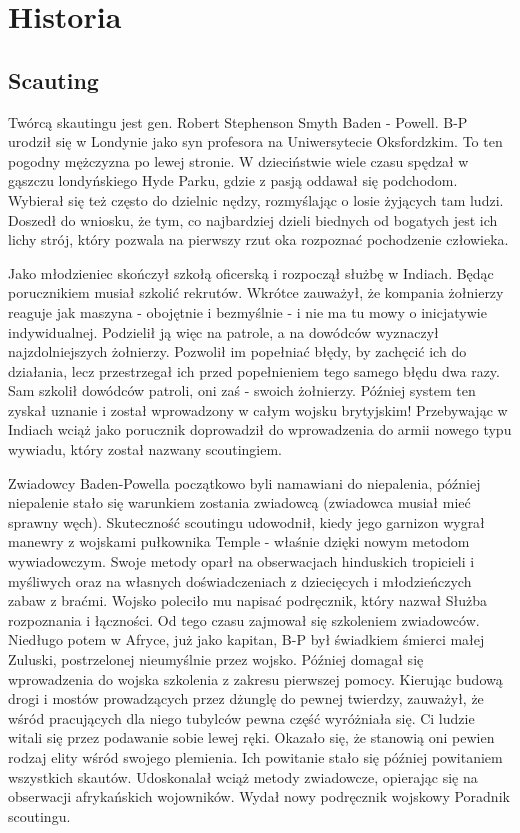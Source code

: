 \chapter{Historia}
\section{Scauting}
Twórcą skautingu jest gen. Robert Stephenson Smyth Baden - Powell. 
B-P urodził się w Londynie jako syn profesora na Uniwersytecie Oksfordzkim. 
To ten pogodny mężczyzna po lewej stronie. 
W dzieciństwie wiele czasu spędzał w gąszczu londyńskiego Hyde Parku, gdzie z pasją oddawał się podchodom. 
Wybierał się też często do dzielnic nędzy, rozmyślając o losie żyjących tam ludzi. 
Doszedł do wniosku, że tym, co najbardziej dzieli biednych od bogatych jest ich lichy strój, który pozwala na pierwszy rzut oka rozpoznać pochodzenie człowieka.

Jako młodzieniec skończył szkołą oficerską i rozpoczął służbę w Indiach. Będąc porucznikiem musiał szkolić rekrutów. 
Wkrótce zauważył, że kompania żołnierzy reaguje jak maszyna - obojętnie i bezmyślnie - i nie ma tu mowy o inicjatywie indywidualnej. 
Podzielił ją więc na patrole, a na dowódców wyznaczył najzdolniejszych żołnierzy. 
Pozwolił im popełniać błędy, by zachęcić ich do działania, lecz przestrzegał ich przed popełnieniem tego samego błędu dwa razy. Sam szkolił dowódców patroli, oni zaś - swoich żołnierzy. 
Później system ten zyskał uznanie i został wprowadzony w całym wojsku brytyjskim! 
Przebywając w Indiach wciąż jako porucznik doprowadził do wprowadzenia do armii nowego typu wywiadu, który został nazwany scoutingiem.

Zwiadowcy Baden-Powella początkowo byli namawiani do niepalenia, później niepalenie stało się warunkiem zostania zwiadowcą (zwiadowca musiał mieć sprawny węch). 
Skuteczność scoutingu udowodnił, kiedy jego garnizon wygrał manewry z wojskami pułkownika Temple - właśnie dzięki nowym metodom wywiadowczym. 
Swoje metody oparł na obserwacjach hinduskich tropicieli i myśliwych oraz na własnych doświadczeniach z dziecięcych i młodzieńczych zabaw z braćmi. Wojsko poleciło mu napisać podręcznik, który nazwał Służba rozpoznania i łączności. 
Od tego czasu zajmował się szkoleniem zwiadowców. 
Niedługo potem w Afryce, już jako kapitan, B-P był świadkiem śmierci małej Zuluski, postrzelonej nieumyślnie przez wojsko. 
Później domagał się wprowadzenia do wojska szkolenia z zakresu pierwszej pomocy. 
Kierując budową drogi i mostów prowadzących przez dżunglę do pewnej twierdzy, zauważył, że wśród pracujących dla niego tubylców pewna część wyróżniała się. 
Ci ludzie witali się przez podawanie sobie lewej ręki. 
Okazało się, że stanowią oni pewien rodzaj elity wśród swojego plemienia. Ich powitanie stało się później powitaniem wszystkich skautów. 
Udoskonalał wciąż metody zwiadowcze, opierając się na obserwacji afrykańskich wojowników. Wydał nowy podręcznik wojskowy Poradnik scoutingu.

